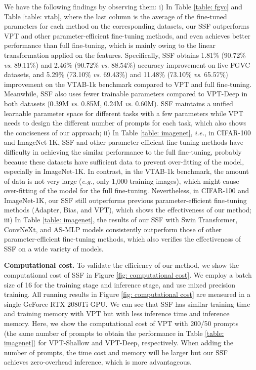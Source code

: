 We have the following findings by observing them: i) In Table \ref{table: fgvc} and Table \ref{table: vtab}, where the last column is the average of the fine-tuned parameters for each method on the corresponding datasets, our SSF outperforms VPT \cite{jia2022visual} and other parameter-efficient fine-tuning methods, and even achieves better performance than full fine-tuning, which is mainly owing to the linear transformation applied on the features. Specifically, SSF obtains 1.81\% (90.72\% \emph{vs}. 89.11\%) and 2.46\% (90.72\% \emph{vs}. 88.54\%) accuracy improvement on five FGVC datasets, and 5.29\% (73.10\% \emph{vs}. 69.43\%) and 11.48\% (73.10\% \emph{vs}. 65.57\%) improvement on the VTAB-1k benchmark compared to VPT and full fine-tuning. Meanwhile, SSF also uses fewer trainable parameters compared to VPT-Deep in both datasets (0.39M \emph{vs}. 0.85M, 0.24M \emph{vs}. 0.60M). SSF maintains a unified learnable parameter space for different tasks with a few parameters while VPT \cite{jia2022visual} needs to design the different number of prompts for each task, which also shows the conciseness of our approach; ii) In Table \ref{table: imagenet}, \emph{i.e.}, in CIFAR-100 and ImageNet-1K, SSF and other parameter-efficient fine-tuning methods have difficulty in achieving the similar performance to the full fine-tuning, probably because these datasets have sufficient data to prevent over-fitting of the model, especially in ImageNet-1K. In contrast, in the VTAB-1k benchmark, the amount of data is not very large (\emph{e.g.}, only 1,000 training images), which might cause over-fitting of the model for the full fine-tuning. Nevertheless, in CIFAR-100 and ImageNet-1K, our SSF still outperforms previous parameter-efficient fine-tuning methods (Adapter, Bias, and VPT), which shows the effectiveness of our method; iii) In Table \ref{table: imagenet}, the results of our SSF with Swin Transformer, ConvNeXt, and AS-MLP models consistently outperform those of other parameter-efficient fine-tuning methods, which also verifies the effectiveness of SSF on a wide variety of models. 

\textbf{Computational cost.} To validate the efficiency of our method, we show the computational cost of SSF in Figure \ref{fig: computational cost}. We employ a batch size of 16 for the training stage and inference stage, and use mixed precision training. All running results in Figure \ref{fig: computational cost} are measured in a single GeForce RTX 2080Ti GPU.  We can see that SSF has similar training time and training memory with VPT but with less inference time and inference memory. Here, we show the computational cost of VPT with 200/50 prompts (the same number of prompts to obtain the performance in Table \ref{table: imagenet}) for VPT-Shallow and VPT-Deep, respectively. When adding the number of prompts, the time cost and memory will be larger but our SSF achieves zero-overhead inference, which is more advantageous.

